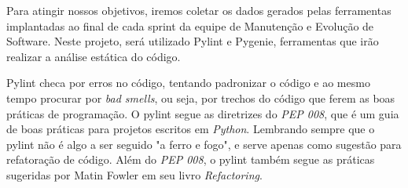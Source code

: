 

Para atingir nossos objetivos, iremos coletar os dados gerados pelas ferramentas
implantadas ao final de cada sprint da equipe de Manutenção e Evolução de Software.
Neste projeto, será utilizado Pylint e Pygenie, ferramentas que irão realizar a
análise estática do código.

Pylint checa por erros no código, tentando padronizar o código e ao mesmo tempo
procurar por \textit{bad smells}, ou seja, por trechos do código que ferem as boas
práticas de programação. O pylint segue as diretrizes do \textit{PEP 008}, que é
um guia de boas práticas para projetos escritos em \textit{Python}. Lembrando sempre
que o pylint não é algo a ser seguido "a ferro e fogo", e serve apenas como sugestão
para refatoração de código. Além do \textit{PEP 008}, o pylint também segue as
práticas sugeridas por Matin Fowler em seu livro \textit{Refactoring}.
